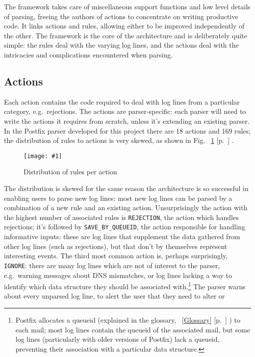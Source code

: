 \documentclass[draft]{svmult}
\newcommand{\showgraph}[3]{%
    \begin{figure}[hbt!]
        \caption{#2}\label{#3}
        \texttt{[image: \#1]}
    \end{figure}
}
\newcommand{\refwithpage}[1]{%
    \empty{}\ref{#1} [p.~\pageref{#1}]%
}
\newcommand{\sectionref}[1]{%
    \textsection{}\refwithpage{#1}%
}
\newcommand{\numberOFrules}[0]{%
    169%
}
\newcommand{\numberOFactions}[0]{%
    18%
}
\begin{document}
The framework takes care of miscellaneous support functions and low level
details of parsing, freeing the authors of actions to concentrate on
writing productive code.  It links actions and rules, allowing either to be
improved independently of the other.  The framework is the core of the
architecture and is deliberately quite simple: the rules deal with the
varying log lines, and the actions deal with the intricacies and
complications encountered when parsing.

\subsection{Actions}

\label{Actions}

Each action contains the code required to deal with log lines from a
particular category, e.g.\ rejections.  The actions are parser-specific:
each parser will need to write the actions it requires from scratch, unless
it's extending an existing parser.  In the Postfix parser developed for
this project there are \numberOFactions{} actions and \numberOFrules{}
rules; the distribution of rules to actions is very skewed, as shown in
Fig.~\refwithpage{Distribution of rules per action}.
\showgraph{build/plot-action-distribution}{Distribution of rules per
action}{Distribution of rules per action} The distribution is skewed for
the same reason the architecture is so successful in enabling users to
parse new log lines: most new log lines can be parsed by a combination of a
new rule and an existing action.  Unsurprisingly the action with the
highest number of associated rules is \texttt{REJECTION}, the action which
handles rejections; it's followed by \texttt{SAVE\_BY\_QUEUEID}, the action
responsible for handling informative inputs: these are log lines that
supplement the data gathered from other log lines (such as rejections), but
that don't by themselves represent interesting events.  The third most
common action is, perhaps surprisingly, \texttt{IGNORE}: there are many log
lines which are not of interest to the parser, e.g.\ warning messages about
DNS mismatches, or log lines lacking a way to identify which data structure
they should be associated with.\footnote{Postfix allocates a queueid
(explained in the glossary,~\sectionref{Glossary}) to each mail; most log
lines contain the queueid of the associated mail, but some log lines
(particularly with older versions of Postfix) lack a queueid, preventing
their association with a particular data structure.}  The parser warns
about every unparsed log line, to alert the user that they need to alter or
\end{document}
